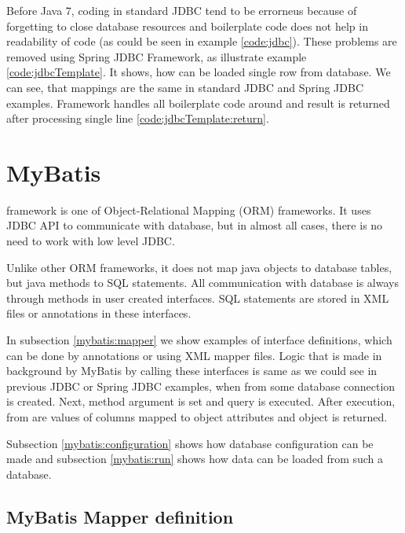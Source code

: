 Before Java 7, coding in standard JDBC tend to be errorneus because of forgetting to close
database resources and boilerplate code does not help in readability of code
(as could be seen in example \ref{code:jdbc}). These problems are removed using Spring JDBC Framework,
as illustrate example \ref{code:jdbcTemplate}. It shows, how can be loaded single row from database.
We can see, that mappings are the same in standard JDBC and Spring JDBC examples.
Framework handles all boilerplate code around and result is returned after processing single line \ref{code:jdbcTemplate:return}.







\section{MyBatis}

\citet{MyBatis} framework is one of Object-Relational Mapping (ORM) frameworks.
It uses JDBC API to communicate with database, but in almost all cases, there is no need
to work with low level JDBC.

Unlike other ORM frameworks, it does not map java objects to database tables, but java methods
to SQL statements. All communication with database is always through methods in user created interfaces.
SQL statements are stored in XML files or annotations in these interfaces.

In subsection \ref{mybatis:mapper} we show examples of  interface definitions,
which can be done by annotations or using XML mapper files.
Logic that is made in background by MyBatis by calling these interfaces
is same as we could see in previous JDBC or Spring JDBC examples,
when from some database connection  is created.
Next, method argument  is set and query is executed.
After execution, from  are values of columns
mapped to object attributes and object is returned.

Subsection \ref{mybatis:configuration} shows how database
configuration can be made and subsection \ref{mybatis:run}
shows how data can be loaded from such a database.



\subsection{MyBatis Mapper definition \label{mybatis:mapper}}

